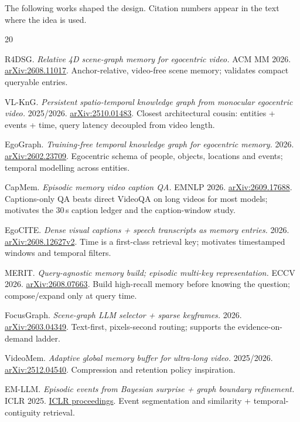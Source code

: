 \documentclass[10pt,a4paper]{article}
\begin{document}
The following works shaped the design. Citation numbers appear in the text where the idea is used.

\begin{thebibliography}{20}\small

 R4DSG. \emph{Relative 4D scene-graph memory for egocentric video.} ACM MM 2026.
\href{https://arxiv.org/abs/2608.11017}{arXiv:2608.11017}.
Anchor-relative, video-free scene memory; validates compact queryable entries.

 VL-KnG. \emph{Persistent spatio-temporal knowledge graph from monocular
egocentric video.} 2025/2026. \href{https://arxiv.org/abs/2510.01483}{arXiv:2510.01483}.
Closest architectural cousin: entities + events + time, query latency decoupled from video length.

 EgoGraph. \emph{Training-free temporal knowledge graph for egocentric memory.}
2026. \href{https://arxiv.org/abs/2602.23709}{arXiv:2602.23709}.
Egocentric schema of people, objects, locations and events; temporal modelling across entities.

 CapMem. \emph{Episodic memory video caption QA.} EMNLP 2026.
\href{https://arxiv.org/abs/2609.17688}{arXiv:2609.17688}.
Captions-only QA beats direct VideoQA on long videos for most models; motivates the 30\,s caption
ledger and the caption-window study.

 EgoCITE. \emph{Dense visual captions + speech transcripts as memory entries.}
2026. \href{https://arxiv.org/pdf/2608.12627v2}{arXiv:2608.12627v2}.
Time is a first-class retrieval key; motivates timestamped windows and temporal filters.

 MERIT. \emph{Query-agnostic memory build; episodic multi-key representation.}
ECCV 2026. \href{https://arxiv.org/abs/2608.07663}{arXiv:2608.07663}.
Build high-recall memory before knowing the question; compose/expand only at query time.

 FocusGraph. \emph{Scene-graph LLM selector + sparse keyframes.} 2026.
\href{https://arxiv.org/abs/2603.04349}{arXiv:2603.04349}.
Text-first, pixels-second routing; supports the evidence-on-demand ladder.

 VideoMem. \emph{Adaptive global memory buffer for ultra-long video.}
2025/2026. \href{https://arxiv.org/abs/2512.04540}{arXiv:2512.04540}.
Compression and retention policy inspiration.

 EM-LLM. \emph{Episodic events from Bayesian surprise + graph boundary refinement.}
ICLR 2025.
\href{https://proceedings.iclr.cc/paper_files/paper/2025/hash/c05144b635df16ac9bbf8246bbbd55ca-Abstract-Conference.html}{ICLR proceedings}.
Event segmentation and similarity + temporal-contiguity retrieval.


\end{thebibliography}
\end{document}
